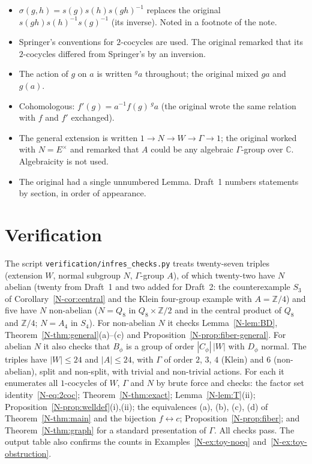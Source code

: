 \documentclass[12pt,letterpaper]{article}
\newcommand{\C}{\mathbb{C}}
\newcommand{\act}[2]{{}^{#1}\!#2}
\begin{document}
\begin{itemize}[itemsep=1pt]
\item $\sigma(g,h)=s(g)s(h)s(gh)^{-1}$ replaces the original
  $s(gh)s(h)^{-1}s(g)^{-1}$ (its inverse). Noted in a footnote of the
  note.
\item Springer's conventions for $2$-cocycles are used. The original
  remarked that its $2$-cocycles differed from Springer's by an inversion.
\item The action of $g$ on $a$ is written $\act{g}{a}$ throughout; the
  original mixed $ga$ and $g(a)$.
\item Cohomologous: $f'(g)=a^{-1}f(g)\,\act{g}{a}$ (the original wrote the
  same relation with $f$ and $f'$ exchanged).
\item The general extension is written $1\to N\to W\to\Gamma\to1$; the
  original worked with $N=E^\times$ and remarked that $A$ could be any
  algebraic $\Gamma$-group over $\C$. Algebraicity is not used.
\item The original had a single unnumbered Lemma. Draft~1 numbers
  statements by section, in order of appearance.
\end{itemize}

\section{Verification}\label{sec:verification}

The script \texttt{verification/infres\_checks.py} treats twenty-seven
triples (extension $W$, normal subgroup $N$, $\Gamma$-group $A$), of which
twenty-two have $N$ abelian (twenty from Draft~1 and two added for
Draft~2: the counterexample $S_3$ of Corollary~\ref{N-cor:central} and the
Klein four-group example with $A=\mathbb{Z}/4$) and five have $N$
non-abelian ($N=Q_8$ in $Q_8\times\mathbb{Z}/2$ and in the central product
of $Q_8$ and $\mathbb{Z}/4$; $N=A_4$ in $S_4$). For non-abelian $N$ it
checks Lemma~\ref{N-lem:BD}, Theorem~\ref{N-thm:general}(a)--(c) and
Proposition~\ref{N-prop:fiber-general}. For abelian $N$ it also checks
that $B_\phi$ is a group of order $|C_\phi|\,|W|$ with $D_\phi$ normal.
The triples have
$|W|\le24$ and $|A|\le24$, with $\Gamma$ of order $2$, $3$, $4$ (Klein) and
$6$ (non-abelian), split and non-split, with trivial and non-trivial
actions. For each it enumerates all $1$-cocycles of $W$, $\Gamma$ and $N$
by brute force and checks: the factor set identity~\eqref{N-eq:2coc};
Theorem~\ref{N-thm:exact}; Lemma~\ref{N-lem:T}(ii);
Proposition~\ref{N-prop:welldef}(i),(ii); the equivalences (a), (b), (c),
(d) of Theorem~\ref{N-thm:main} and the bijection $f\leftrightarrow c$;
Proposition~\ref{N-prop:fiber}; and Theorem~\ref{N-thm:graph} for a
standard presentation of $\Gamma$. All checks pass. The output table also
confirms the counts in Examples~\ref{N-ex:toy-noeq}
and~\ref{N-ex:toy-obstruction}.
\end{document}
